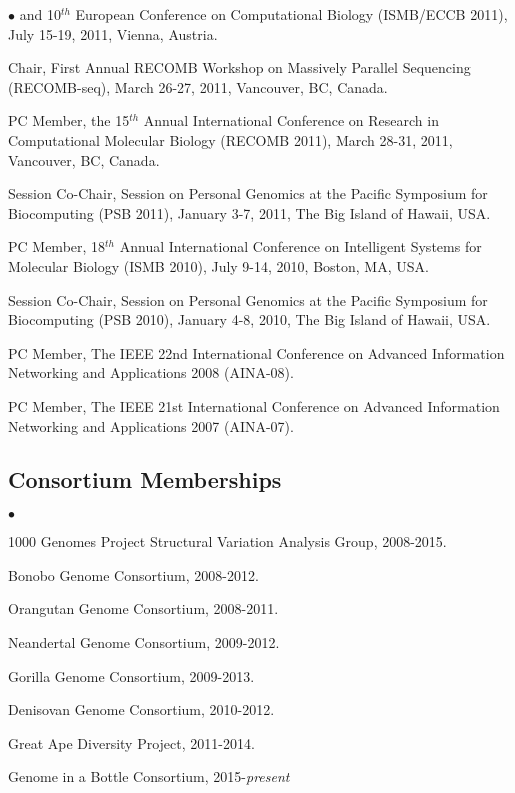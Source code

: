 \documentclass[margin,line]{res}
\newenvironment{list2}{
  \begin{list}{$\bullet$}{%
      \setlength{\itemsep}{0in}
      \setlength{\parsep}{0in} \setlength{\parskip}{0in}
      \setlength{\topsep}{0in} \setlength{\partopsep}{0in} 
      \setlength{\leftmargin}{0.2in}}}{\end{list}}
\begin{document}
\begin{resume}
\begin{list2}
  and 10$^{th}$ European Conference on Computational Biology 
  (ISMB/ECCB 2011), July 15-19, 2011, Vienna, Austria.
\item
  Chair, First Annual RECOMB Workshop on Massively Parallel Sequencing (RECOMB-seq), March 26-27, 2011, Vancouver, BC, Canada.
\item
  PC Member, the 15$^{th}$ Annual International Conference on Research in Computational Molecular Biology
  (RECOMB 2011), March 28-31, 2011, Vancouver, BC, Canada.
\item 
  Session Co-Chair, Session on Personal Genomics at the Pacific Symposium for Biocomputing (PSB 2011),
  January 3-7, 2011, The Big Island of Hawaii, USA.
\item
  PC Member, 18$^{th}$ Annual International Conference on Intelligent Systems for Molecular Biology
  (ISMB 2010), July 9-14, 2010, Boston, MA, USA.
\item 
  Session Co-Chair, Session on Personal Genomics at the Pacific Symposium for Biocomputing (PSB 2010),
  January 4-8, 2010, The Big Island of Hawaii, USA.
\item
  PC Member, The IEEE 22nd International Conference on
  Advanced Information Networking and Applications 2008 (AINA-08).
\item
  PC Member, The IEEE 21st International Conference on
  Advanced Information Networking and Applications 2007 (AINA-07).
\end{list2}


\vspace{-0.6cm}
\subsection{\small \sc Consortium Memberships}

\begin{list2}
\item
  1000 Genomes Project Structural Variation Analysis Group, 2008-2015.
\item
  Bonobo Genome Consortium, 2008-2012.
\item
  Orangutan Genome Consortium, 2008-2011.
\item
  Neandertal Genome Consortium, 2009-2012.
\item
  Gorilla Genome Consortium, 2009-2013.
\item
  Denisovan Genome Consortium, 2010-2012.
\item
  Great Ape Diversity Project, 2011-2014.
\item
  Genome in a Bottle Consortium, 2015-{\it present}
\end{list2}



\end{resume}
\end{document}
